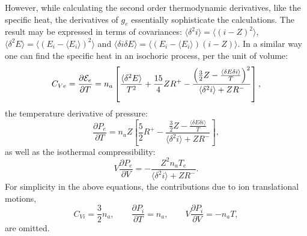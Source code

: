 However, while calculating the second order thermodynamic derivatives, like the specific heat, the derivatives of $g_e$ essentially sophisticate the 
calculations. The result may be expressed in terms of covariances: $\langle\delta^2i\rangle=\langle(i-Z)^2\rangle$, $\langle\delta^2E\rangle=\langle(E_i-\langle E_i\rangle)^2 \rangle$ and 
$\langle\delta i\delta E\rangle=\langle(E_i-\langle E_i\rangle)(i-Z)\rangle$. In a similar way one can find the specific heat in an isochoric process, per the unit of volume:
\begin{equation}
C_{Ve}=\frac{\partial {\cal E}_e}{\partial T}=n_a\left[\frac{\langle\delta^2E\rangle}{T^2}+\frac{15}4ZR^+
-\frac{\left(\frac32Z-\frac{\langle\delta E\delta i\rangle}T\right)^2}{\langle\delta^2i\rangle+ZR^-}\right],
\end{equation}
the temperature derivative of pressure:
\begin{equation}
\frac {\partial P_e}{\partial T}=n_aZ\left[\frac52 R^+ -\frac{\frac32Z-\frac{\langle\delta E\delta i\rangle}T}{\langle\delta^2i\rangle+ZR^-}\right],
\end{equation}
as well as the isothermal compressibility:
\begin{equation}
V\frac{\partial P_e}{\partial V}=-\frac{Z^2n_aT_e}{\langle\delta^2i\rangle+ZR^-}.
\end{equation}
For simplicity in the above equations, the contributions due to ion translational motions, 
\begin{equation}
C_{Vi}=\frac32n_a, \qquad
\frac{\partial P_i}{\partial T}=n_a, \qquad
V\frac{\partial P_i}{\partial V}=-n_aT,
\end{equation}
are omitted.
